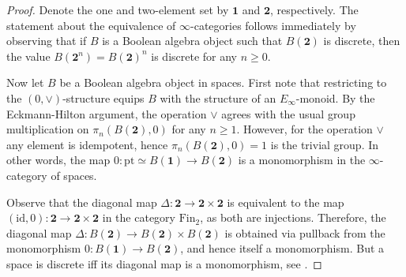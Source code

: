 \documentclass[10pt]{amsart}
\theoremstyle{definition}
\begin{document}
\begin{proof} Denote the one and two-element set by $\mathbf{1}$ and $\mathbf{2}$, respectively. The statement about the equivalence of $\infty$-categories follows immediately by observing that if $B$ is a Boolean algebra object such that $B(\mathbf{2})$ is discrete, then the value $B(\mathbf{2}^n) = B(\mathbf{2})^n$ is discrete for any $n \geq 0$.

Now let $B$ be a Boolean algebra object in spaces. First note that restricting to the $(0, \vee)$-structure equips $B$ with the structure of an $E_\infty$-monoid. By the Eckmann-Hilton argument, the operation $\vee$ agrees with the usual group multiplication on $\pi_n( B(\mathbf{2}), 0 )$ for any $n \geq 1$. However, for the operation $\vee$ any element is idempotent, hence $\pi_n( B(\mathbf{2}), 0 ) = 1$ is the trivial group. In other words, the map $0 : \mathrm{pt} \simeq B(\mathbf{1}) \rightarrow B(\mathbf{2})$ is a monomorphism in the $\infty$-category of spaces.

Observe that the diagonal map $\Delta : \mathbf{2} \rightarrow \mathbf{2} \times \mathbf{2}$ is equivalent to 
the map $(\mathrm{id},0) : \mathbf{2} \rightarrow \mathbf{2} \times \mathbf{2}$ in the category $\mathrm{Fin}_2$, as both are injections. Therefore, the diagonal map $\Delta : B(\mathbf{2}) \rightarrow B(\mathbf{2}) \times B(\mathbf{2})$ is obtained via pullback from the monomorphism $0 : B(\mathbf{1}) \rightarrow B(\mathbf{2})$, and hence itself a monomorphism. But a space is discrete iff its diagonal map is a monomorphism, see \cite[Lemma 5.5.6.17.]{luriehtt}.
\end{proof}
\end{document}
